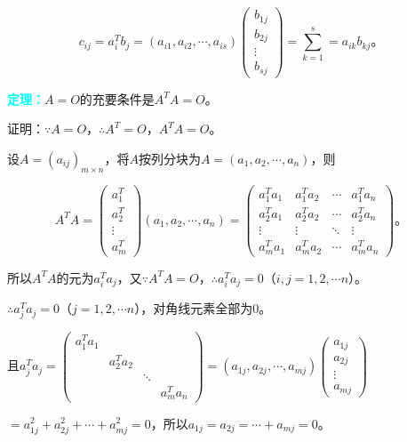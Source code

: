 \documentclass[UTF8, 12pt]{ctexart}
\begin{document}
$$c_{ij}=a_i^Tb_j=(a_{i1},a_{i2},\cdots,a_{is})\left(\begin{array}{c}
    b_{1j} \\
    b_{2j} \\
    \vdots \\
    b_{sj}
\end{array}\right)=\sum\limits_{k=1}^s=a_{ik}b_{kj}\text{。}$$

\textcolor{aqua}{\textbf{定理：}}$A=O$的充要条件是$A^TA=O$。

证明：$\because A=O$，$\therefore A^T=O$，$A^TA=O$。

设$A=(a_{ij})_{m\times n}$，将$A$按列分块为$A=(a_1,a_2,\cdots,a_n)$，则

$$A^TA=\left(
    \begin{array}{c}
        a_1^T \\
        a_2^T \\
        \vdots \\
        a_{m}^T
    \end{array}
\right)(a_1,a_2,\cdots,a_n)=\left(
    \begin{array}{cccc}
        a_1^Ta_1 & a_1^Ta_2 & \cdots & a_1^Ta_n \\
        a_2^Ta_1 & a_2^Ta_2 & \cdots & a_2^Ta_n \\
        \vdots & \vdots & \ddots & \vdots \\
        a_{m}^Ta_1 & a_{m}^Ta_2 & \cdots & a_{m}^Ta_n
    \end{array}
\right)\text{。}$$

所以$A^TA$的元为$a^T_ia_j$，又$\because A^TA=O$，$\therefore a^T_ia_j=0$（$i,j=1,2,\cdots n$）。

$\therefore a^T_ja_j=0$（$j=1,2,\cdots n$），对角线元素全部为0。

且$a^T_ja_j=\left(
    \begin{array}{cccc}
        a_1^Ta_1 & & & \\
         & a_2^Ta_2 & & \\
         & & \ddots & \\
         & & & a_{m}^Ta_n
    \end{array}
\right)=(a_{1j},a_{2j},\cdots,a_{mj})\left(\begin{array}{c}
    a_{1j} \\
    a_{2j} \\
    \vdots \\
    a_{mj}
\end{array}\right)$

$=a_{1j}^2+a_{2j}^2+\cdots+a_{mj}^2=0$，所以$a_{1j}=a_{2j}=\cdots+a_{mj}=0$。
\end{document}

